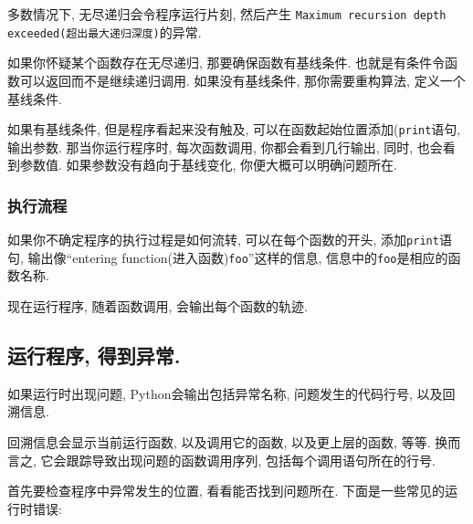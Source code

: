 \documentclass[10pt]{book}
\begin{document}
多数情况下, 无尽递归会令程序运行片刻, 然后产生
{\tt Maximum recursion depth exceeded(超出最大递归深度)}的异常. 

如果你怀疑某个函数存在无尽递归, 那要确保函数有基线条件. 
也就是有条件令函数可以返回而不是继续递归调用. 
如果没有基线条件, 那你需要重构算法, 定义一个基线条件. 

如果有基线条件, 但是程序看起来没有触及, 
可以在函数起始位置添加({\tt print}语句, 输出参数. 
那当你运行程序时, 每次函数调用, 你都会看到几行输出, 
同时, 也会看到参数值. 
如果参数没有趋向于基线变化, 你便大概可以明确问题所在. 


\subsubsection{执行流程}

如果你不确定程序的执行过程是如何流转, 
可以在每个函数的开头, 添加{\tt print}语句, 
输出像``entering function(进入函数){\tt foo}''这样的信息, 
信息中的{\tt foo}是相应的函数名称.

现在运行程序, 随着函数调用, 会输出每个函数的轨迹. 


\subsection{运行程序, 得到异常.}

如果运行时出现问题, Python会输出包括异常名称, 
问题发生的代码行号, 以及回溯信息. 

回溯信息会显示当前运行函数, 以及调用它的函数, 以及更上层的函数, 等等. 
换而言之, 它会跟踪导致出现问题的函数调用序列, 包括每个调用语句所在的行号. 

首先要检查程序中异常发生的位置, 
看看能否找到问题所在. 
下面是一些常见的运行时错误:
\end{document}
